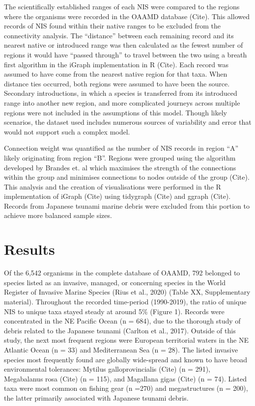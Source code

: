 \documentclass[a4paper, nobind]{templates/ociamthesis}
\begin{document}
The scientifically established ranges of each NIS were compared to the regions where the organisms were recorded in the OAAMD database (Cite). This allowed records of NIS found within their native ranges to be excluded from the connectivity analysis. The ``distance'' between each remaining record and its nearest native or introduced range was then calculated as the fewest number of regions it would have ``passed through'' to travel between the two using a breath first algorithm in the iGraph implementation in R (Cite). Each record was assumed to have come from the nearest native region for that taxa. When distance ties occurred, both regions were assumed to have been the source. Secondary introductions, in which a species is transferred from its introduced range into another new region, and more complicated journeys across multiple regions were not included in the assumptions of this model. Though likely scenarios, the dataset used includes numerous sources of variability and error that would not support such a complex model.

Connection weight was quantified as the number of NIS records in region ``A'' likely originating from region ``B''. Regions were grouped using the algorithm developed by Brandes et. al which maximises the strength of the connections within the group and minimises connections to nodes outside of the group (Cite). This analysis and the creation of visualisations were performed in the R implementation of iGraph (Cite) using tidygraph (Cite) and ggraph (Cite). Records from Japanese tsunami marine debris were excluded from this portion to achieve more balanced sample sizes.

\hypertarget{results-1}{%
\section{Results}\label{results-1}}

Of the 6,542 organisms in the complete database of OAAMD, 792 belonged to species listed as an invasive, managed, or concerning species in the World Register of Invasive Marine Species (Rius et al., 2020) (Table XX, Supplementary material). Throughout the recorded time-period (1990-2019), the ratio of unique NIS to unique taxa stayed steady at around 5\% (Figure 1). Records were concentrated in the NE Pacific Ocean (n = 684), due to the thorough study of debris related to the Japanese tsunami (Carlton et al., 2017). Outside of this study, the next most frequent regions were European territorial waters in the NE Atlantic Ocean (n = 33) and Mediterranean Sea (n = 28). The listed invasive species most frequently found are globally wide-spread and known to have broad environmental tolerances: Mytilus galloprovincialis (Cite) (n = 291), Megabalanus rosa (Cite) (n = 115), and Magallana gigas (Cite) (n = 74). Listed taxa were most common on fishing gear (n =270) and megastructures (n = 200), the latter primarily associated with Japanese tsunami debris.
\end{document}
